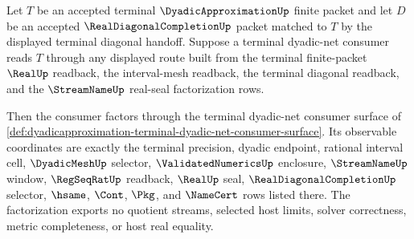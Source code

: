 \begin{theorem}
\label{thm:dyadicapproximation-terminal-dyadic-net-consumption}
Let $T$ be an accepted terminal $\DyadicApproximationUp$ finite packet and let
$D$ be an accepted $\RealDiagonalCompletionUp$ packet matched to $T$ by the
displayed terminal diagonal handoff. Suppose a terminal dyadic-net consumer
reads $T$ through any displayed route built from the terminal finite-packet
$\RealUp$ readback, the interval-mesh readback, the terminal diagonal
readback, and the $\StreamNameUp$ real-seal factorization rows.

Then the consumer factors through the terminal dyadic-net consumer surface of
\autoref{def:dyadicapproximation-terminal-dyadic-net-consumer-surface}. Its
observable coordinates are exactly the terminal precision, dyadic endpoint,
rational interval cell, $\DyadicMeshUp$ selector, $\ValidatedNumericsUp$
enclosure, $\StreamNameUp$ window, $\RegSeqRatUp$ readback, $\RealUp$ seal,
$\RealDiagonalCompletionUp$ selector, $\hsame$, $\Cont$, $\Pkg$, and
$\NameCert$ rows listed there. The factorization exports no quotient streams,
selected host limits, solver correctness, metric completeness, or host real
equality.
\end{theorem}
